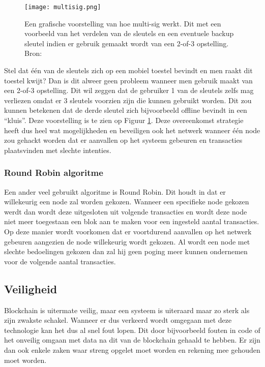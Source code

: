 \begin{figure}
	\texttt{[image: multisig.png]}
	\caption{Een grafische voorstelling van hoe multi-sig werkt. Dit met een voorbeeld van het verdelen van de sleutels en een eventuele backup sleutel indien er gebruik gemaakt wordt van een 2-of-3 opstelling. Bron: \textcite{99bitcoins}}
	\label{fig:multisig}
\end{figure}

Stel dat één van de sleutels zich op een mobiel toestel bevindt en men raakt dit toestel kwijt? 
Dan is dit alweer geen probleem wanneer men gebruik maakt van een 2-of-3 opstelling. Dit wil zeggen dat de gebruiker 1 van de sleutels zelfs mag verliezen omdat er 3 sleutels voorzien zijn die kunnen gebruikt worden. Dit zou kunnen betekenen dat de derde sleutel zich bijvoorbeeld offline bevindt in een ``kluis''. Deze voorstelling is te zien op Figuur \ref{fig:multisig}. Deze overeenkomst strategie heeft dus heel wat mogelijkheden en beveiligen ook het netwerk wanneer één node zou gehackt worden dat er aanvallen op het systeem gebeuren en transacties plaatsvinden met slechte intenties. 

\subsubsection{Round Robin algoritme}
Een ander veel gebruikt algoritme is Round Robin. Dit houdt in dat er willekeurig een node zal worden gekozen. Wanneer een specifieke node gekozen werdt dan wordt deze uitgesloten uit volgende transacties en wordt deze node niet meer toegestaan een blok aan te maken voor een ingesteld aantal transacties. Op deze manier wordt voorkomen dat er voortdurend aanvallen op het netwerk gebeuren aangezien de node willekeurig wordt gekozen. Al wordt een node met slechte bedoelingen gekozen dan zal hij geen poging meer kunnen ondernemen voor de volgende aantal transacties. 

\subsection{Veiligheid}
Blockchain is uitermate veilig, maar een systeem is uiteraard maar zo sterk als zijn zwakste schakel. Wanneer er dus verkeerd wordt omgegaan met deze technologie kan het dus al snel fout lopen. Dit door bijvoorbeeld fouten in code of het onveilig omgaan met data na dit van de blockchain gehaald te hebben. Er zijn dan ook enkele zaken waar streng opgelet moet worden en rekening mee gehouden moet worden. 

